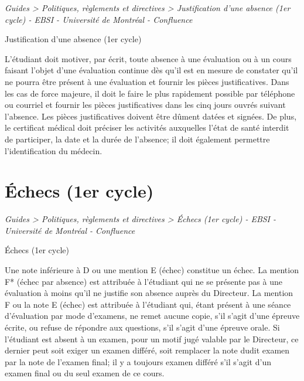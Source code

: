 \documentclass [12 pt]{article}
\begin{document}
        \textit{
        Guides > Politiques, règlements et directives > Justification d'une
            absence (1er cycle) - EBSI - Université de Montréal - Confluence
        }
    
        Justification d'une absence (1er cycle)
        
            L'étudiant doit motiver, par écrit, toute absence à une évaluation ou à un cours
                faisant l'objet d'une évaluation continue dès qu'il est en mesure de constater qu'il
                ne pourra être présent à une évaluation et fournir les pièces justificatives. Dans
                les cas de force majeure, il doit le faire le plus rapidement possible par téléphone
                ou courriel et fournir les pièces justificatives dans les cinq jours ouvrés suivant
                l'absence.
            Les pièces justificatives doivent être dûment datées et signées. De plus, le
                certificat médical doit préciser les activités auxquelles l'état de santé interdit
                de participer, la date et la durée de l'absence; il doit également permettre
                l'identification du médecin.
        
    
    
        \newpage
        \section {
        Échecs (1er cycle)
        }
        
        
        
        \textit{
        Guides > Politiques, règlements et directives > Échecs (1er cycle) - EBSI -
            Université de Montréal - Confluence
        }
    
        Échecs (1er cycle)
        
            Une note inférieure à D ou une mention E (échec) constitue un échec.
            La mention F* (échec par absence) est attribuée à l'étudiant qui ne se présente pas à
                une évaluation à moins qu'il ne justifie son absence auprès du Directeur.
            La mention F ou la note E (échec) est attribuée à l'étudiant qui, étant présent à une
                séance d'évaluation par mode d'examens, ne remet aucune copie, s'il s'agit d'une
                épreuve écrite, ou refuse de répondre aux questions, s'il s'agit d'une épreuve
                orale.
            Si l'étudiant est absent à un examen, pour un motif jugé valable par le Directeur, ce
                dernier peut soit exiger un examen différé, soit remplacer la note dudit examen par
                la note de l'examen final; il y a toujours examen différé s'il s'agit d'un examen
                final ou du seul examen de ce cours.
        
\end{document}
